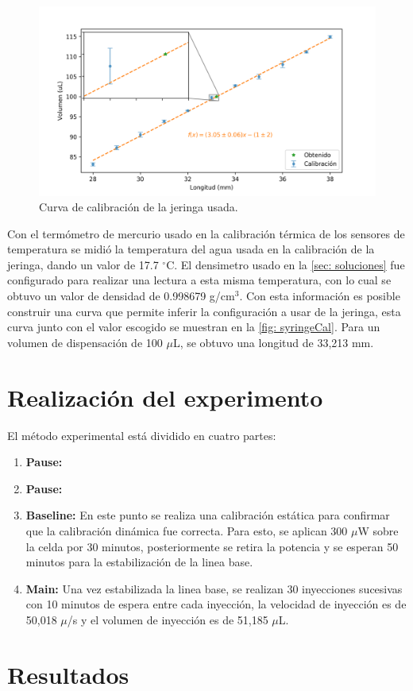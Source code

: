 		\begin{figure}[h]
			\centering
			\includegraphics[width=\linewidth]{../Data/Syringe/syringe_cal.png}
			\caption{Curva de calibraci\'on de la jeringa usada.}
			\label{fig: syringeCal}
		\end{figure}
	
		Con el termómetro de mercurio usado en la calibración térmica de los sensores de temperatura se midió la temperatura del agua usada en la calibración de la jeringa, dando un valor de 17.7 $^\circ$C. El densimetro usado en la \autoref{sec: soluciones} fue configurado para realizar una lectura a esta misma temperatura, con lo cual se obtuvo un valor de densidad de 0.998679 g/cm$^3$. Con esta información es posible construir una curva que permite inferir la configuración a usar de la jeringa, esta curva junto con el valor escogido se muestran en la \autoref{fig: syringeCal}. Para un volumen de dispensación de 100 $\mu$L, se obtuvo una longitud de 33,213 mm.
		\newline
	
\section{Realizaci\'on del experimento}
	El m\'etodo experimental est\'a dividido en cuatro partes:
	\begin{enumerate}
		\item \textbf{Pause:}
		\item \textbf{Pause:}
		
		\item \textbf{Baseline:} En este punto se realiza una calibraci\'on est\'atica para confirmar que la calibraci\'on din\'amica fue correcta. Para esto, se aplican 300 $\mu$W sobre la celda por 30 minutos, posteriormente se retira la potencia y se esperan 50 minutos para la estabilizaci\'on de la linea base.
		
		\item \textbf{Main:} Una vez estabilizada la linea base, se realizan 30 inyecciones sucesivas con 10 minutos de espera entre cada inyecci\'on, la velocidad de inyecci\'on es de 50,018 $\mu$/s y el volumen de inyecci\'on es de 51,185 $\mu$L.
	\end{enumerate}

\section{Resultados}


		
